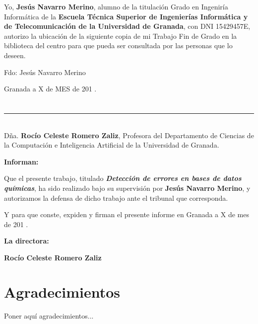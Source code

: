 Yo, \textbf{Jesús Navarro Merino}, alumno de la titulación Grado en Ingeniría Informática de la \textbf{Escuela Técnica Superior
de Ingenierías Informática y de Telecomunicación de la Universidad de Granada}, con DNI 15429457E, autorizo la
ubicación de la siguiente copia de mi Trabajo Fin de Grado en la biblioteca del centro para que pueda ser
consultada por las personas que lo deseen.

\vspace{6cm}

\noindent Fdo: Jesús Navarro Merino

\vspace{2cm}

\begin{flushright}
Granada a X de MES de 201 .
\end{flushright}


\chapter*{}
\thispagestyle{empty}

\noindent\rule[-1ex]{\textwidth}{2pt}\\[4.5ex]

Dña. \textbf{Rocío Celeste Romero Zaliz}, Profesora del Departamento de Ciencias de la Computación e Inteligencia Artificial de la Universidad de Granada.


\vspace{0.5cm}

\textbf{Informan:}

\vspace{0.5cm}

Que el presente trabajo, titulado \textit{\textbf{Detección de errores en bases de datos químicas}},
ha sido realizado bajo su supervisión por \textbf{Jesús Navarro Merino}, y autorizamos la defensa de dicho trabajo ante el tribunal que corresponda.

\vspace{0.5cm}

Y para que conste, expiden y firman el presente informe en Granada a X de mes de 201 .

\vspace{1cm}

\textbf{La directora:}

\vspace{5cm}

\noindent \textbf{Rocío Celeste Romero Zaliz}

\chapter*{Agradecimientos}
\thispagestyle{empty}

       \vspace{1cm}


Poner aquí agradecimientos...

